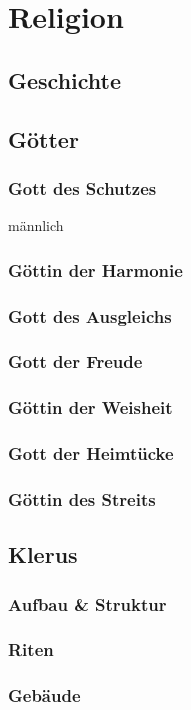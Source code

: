 \chapter{Religion}
\section{Geschichte}
\section{Götter}
\subsection{Gott des Schutzes}
männlich

\subsection{Göttin der Harmonie}
\subsection{Gott des Ausgleichs}
\subsection{Gott der Freude}
\subsection{Göttin der Weisheit}
\subsection{Gott der Heimtücke}
\subsection{Göttin des Streits}

\section{Klerus}
\subsection{Aufbau \& Struktur}
\subsection{Riten}
\subsection{Gebäude}
